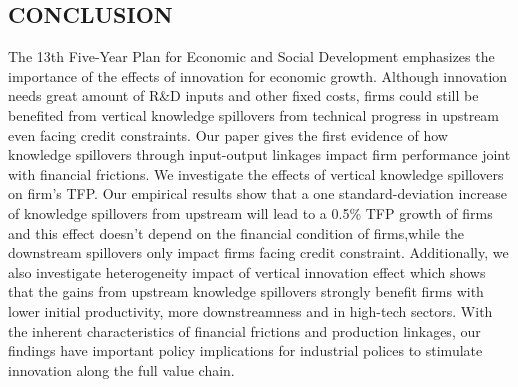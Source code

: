 \documentclass[12pt]{article}%
\begin{document}
\begin{CJK*}{GBK}{fs}
%


\section{CONCLUSION}
\par The 13th Five-Year Plan for Economic and Social Development emphasizes the importance of the effects of innovation for economic growth. Although innovation needs great amount of R\&D inputs and other fixed costs, firms could still be benefited from vertical knowledge spillovers from technical progress in upstream even facing credit constraints. Our paper gives the first evidence of how knowledge spillovers through input-output linkages impact firm performance joint with financial frictions. We investigate the effects of vertical knowledge spillovers on firm's TFP. Our empirical results show that a one standard-deviation increase of knowledge spillovers from upstream will lead to a 0.5\% TFP growth of firms and this effect doesn't depend on the financial condition of firms,while the downstream spillovers only impact firms facing credit constraint. Additionally,  we also investigate  heterogeneity impact of vertical innovation effect which shows that  the gains from upstream knowledge spillovers strongly benefit firms with lower initial productivity, more downstreamness and in high-tech sectors. With the inherent characteristics of financial frictions and production linkages, our findings have important policy implications for industrial polices to stimulate innovation along the full value chain.



\nocite{*}







\end{CJK*}
\end{document}
